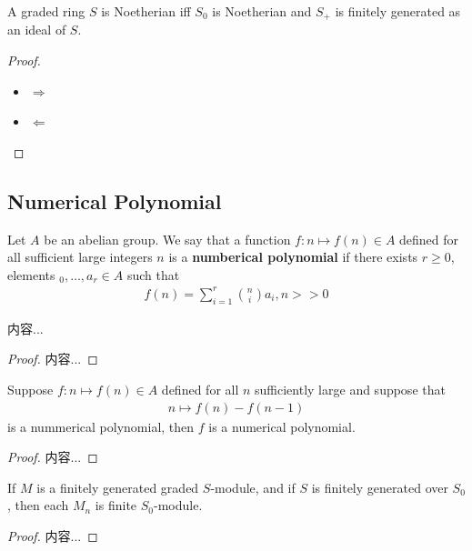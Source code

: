 \documentclass[Total.tex]{subfiles}
\begin{document}
			\begin{lemma}
				A graded ring $S$ is Noetherian iff $S_0$ is Noetherian and $S_+$ is finitely generated as an ideal of $S$.
			\end{lemma}
			\begin{proof}
				\begin{itemize}
					\item $\Rightarrow$
					\item $\Leftarrow$
				\end{itemize}
			\end{proof}
			
			\subsection{Numerical Polynomial}
				\begin{Def}
					Let $A$ be an abelian group. We say that a function $f:n\mapsto f(n)\in A$ defined for all sufficient large integers $n$ is a \textbf{numberical polynomial} if there exists $r\geq 0$, elements $_0,\dots,a_r\in A$ such that
					\begin{gather*}
						f(n)=\sum_{i=1}^r \binom{n}{i}a_i,n>>0
					\end{gather*}
				\end{Def}
				\begin{lemma}
					内容...
				\end{lemma}
				\begin{proof}
					内容...
				\end{proof}
				\begin{lemma}
					Suppose $f:n\mapsto f(n)\in A$ defined for all $n$ sufficiently large and suppose that
					\begin{gather*}
						n\mapsto f(n)-f(n-1)
					\end{gather*} 
					is a nummerical polynomial, then $f$ is a numerical polynomial.
				\end{lemma}
				\begin{proof}
					内容...
				\end{proof}
				
				\begin{lemma}
					If $M$ is a finitely generated graded $S$-module, and if $S$ is finitely generated over $S_0$, then each $M_n$ is finite $S_0$-module.
				\end{lemma}
				\begin{proof}
					内容...
				\end{proof}
				
\end{document}
